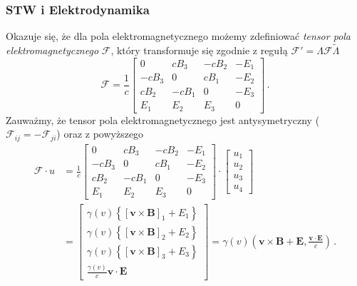 \documentclass[../main.tex]{subfiles}
\begin{document}
\subsubsection{STW i Elektrodynamika}
Okazuje się, że dla pola elektromagnetycznego możemy zdefiniować \textit{tensor pola elektromagnetycznego} \(\mathscr{F}\), który transformuje się zgodnie z regułą \(\mathscr{F}'=\Lambda\mathscr{F}\tilde{\Lambda}\)
\begin{equation*}
    \mathscr{F}=\frac{1}{c}\left[\begin{array}{cccc}
         0&cB_3&-cB_2&-E_1  \\
         -cB_3&0&cB_1&-E_2 \\
         cB_2&-cB_1&0&-E_3 \\
         E_1 &E_2&E_3&0
    \end{array}\right]\,.
\end{equation*}
Zauważmy, że tensor pola elektromagnetycznego jest antysymetryczny (\(\mathscr{F}_{ij}=-\mathscr{F}_{ji}\)) oraz z powyższego
\begin{equation*}
\begin{split}
    \mathscr{F}\cdot u&=\frac{1}{c}\left[\begin{array}{cccc}
         0&cB_3&-cB_2&-E_1  \\
         -cB_3&0&cB_1&-E_2 \\
         cB_2&-cB_1&0&-E_3 \\
         E_1 &E_2&E_3&0
    \end{array}\right]\cdot \left[\begin{array}{c}
         u_1 \\
         u_2 \\
         u_3 \\
         u_4 
    \end{array}\right]\\
    &=\left[\begin{array}{c}
         \gamma(v)\left\{[\mathbf{v}\times\mathbf{B}]_1+E_1\right\}  \\
         \gamma(v)\left\{[\mathbf{v}\times\mathbf{B}]_2+E_2\right\}  \\
         \gamma(v)\left\{[\mathbf{v}\times\mathbf{B}]_3+E_3\right\}  \\
         \frac{\gamma(v)}{c}\mathbf{v}\cdot\mathbf{E}
    \end{array}\right]=\gamma(v)\left(\mathbf{v}\times\mathbf{B}+\mathbf{E},\frac{\mathbf{v}\cdot\mathbf{E}}{c}\right)\,.
\end{split}
\end{equation*}
\end{document}
